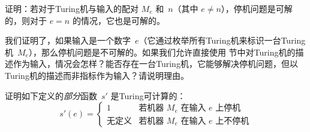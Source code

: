 \documentclass[../../../include/open-logic-section]{subfiles}
\begin{document}
\begin{prob}
证明：若对于Turing机与输入的配对 $M_e$ 和~$n$（其中 $e \neq n$），停机问题是可解的，则对于 $e = n$ 的情况，它也是可解的。
\end{prob}

\begin{prob}
我们证明了，如果输入是一个数字~$e$（它通过枚举所有Turing机来标识一台Turing机~$M_e$），那么停机问题是不可解的。如果我们允许直接使用  节中对Turing机的描述作为输入，情况会怎样？能否存在一台Turing机，它能够解决停机问题，但以Turing机的描述而非指标作为输入？请说明理由。
\end{prob}

\begin{prob} 证明如下定义的\emph{部分}函数~$s'$ 是Turing可计算的：
  \[
  s'(e) =
  \begin{cases}
    \text{1} & \text{若机器~$M_e$ 在输入 $e$ 上停机}\\
    \text{无定义} & \text{若机器~$M_e$ 在输入 $e$ 上不停机}
  \end{cases}
  \]
\end{prob}
\end{document}
